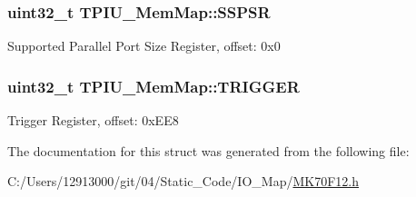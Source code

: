 \subsubsection[{S\+S\+P\+S\+R}]{\setlength{\rightskip}{0pt plus 5cm}uint32\+\_\+t T\+P\+I\+U\+\_\+\+Mem\+Map\+::\+S\+S\+P\+S\+R}\label{struct_t_p_i_u___mem_map_a3570cf26e2ddc1d5700776743b0506e3}
Supported Parallel Port Size Register, offset\+: 0x0 \hypertarget{struct_t_p_i_u___mem_map_a267271b4e2d7ad48cba1614440c741fb}{}
\subsubsection[{T\+R\+I\+G\+G\+E\+R}]{\setlength{\rightskip}{0pt plus 5cm}uint32\+\_\+t T\+P\+I\+U\+\_\+\+Mem\+Map\+::\+T\+R\+I\+G\+G\+E\+R}\label{struct_t_p_i_u___mem_map_a267271b4e2d7ad48cba1614440c741fb}
Trigger Register, offset\+: 0x\+E\+E8 

The documentation for this struct was generated from the following file\+:\begin{DoxyCompactItemize}
\item 
C\+:/\+Users/12913000/git/04/\+Static\+\_\+\+Code/\+I\+O\+\_\+\+Map/\hyperlink{_m_k70_f12_8h}{M\+K70\+F12.\+h}\end{DoxyCompactItemize}
